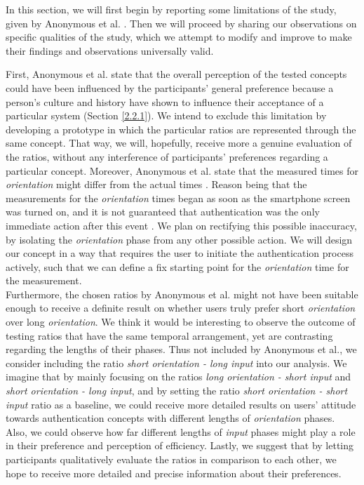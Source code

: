 In this section, we will first begin by reporting some limitations of the study, given by Anonymous et al. \cite{anonymous}. Then we will proceed by sharing our observations on specific qualities of the study, which we attempt to modify and improve to make their findings and observations universally valid.  

First, Anonymous et al. \cite{anonymous} state that the overall perception of the tested concepts could have been influenced by the participants' general preference \cite{anonymous} because a person's culture and history have shown to influence their acceptance of a particular system \cite{Harbach:2016} (Section \ref{2.2.1}). We intend to exclude this limitation by developing a prototype in which the particular ratios are represented through the same concept. That way, we will, hopefully, receive more a genuine evaluation of the ratios, without any interference of participants' preferences regarding a particular concept. Moreover, Anonymous et al. \cite{anonymous} state that the measured times for \textit{orientation} might differ from the actual times \cite{anonymous}. Reason being that the measurements for the \textit{orientation} times began as soon as the smartphone screen was turned on, and it is not guaranteed that authentication was the only immediate action after this event \cite{anonymous}. We plan on rectifying this possible inaccuracy, by isolating the \textit{orientation} phase from any other possible action. We will design our concept in a way that requires the user to initiate the authentication process actively, such that we can define a fix starting point for the \textit{orientation} time for the measurement.\\

Furthermore, the chosen ratios by Anonymous et al. \cite{anonymous} might not have been suitable enough to receive a definite result on whether users truly prefer short \textit{orientation} over long \textit{orientation}. We think it would be interesting to observe the outcome of testing ratios that have the same temporal arrangement, yet are contrasting regarding the lengths of their phases. Thus not included by Anonymous et al., we consider including the ratio \textit{short orientation - long input} into our analysis. We imagine that by mainly focusing on the ratios \textit{long orientation - short input} and \textit{short orientation - long input}, and by setting the ratio \textit{short orientation - short input} ratio as a baseline, we could receive more detailed results on users' attitude towards authentication concepts with different lengths of \textit{orientation} phases. Also, we could observe how far different lengths of \textit{input} phases might play a role in their preference and perception of efficiency. Lastly, we suggest that by letting participants qualitatively evaluate the ratios in comparison to each other, we hope to receive more detailed and precise information about their preferences.  







